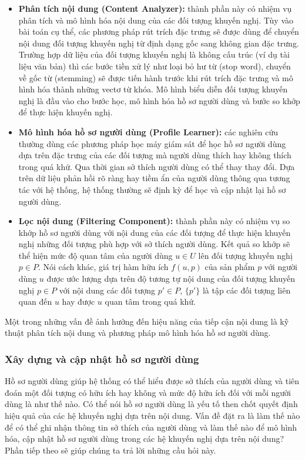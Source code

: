 \begin{itemize}
	\item \textbf{Phân tích nội dung (Content Analyzer):} thành phần này có nhiệm vụ phân tích và mô hình hóa nội dung của các đối tượng khuyến nghị. Tùy vào bài toán cụ thể, các phương pháp rút trích đặc trưng sẽ được dùng để chuyển nội dung đối tượng khuyến nghị từ định dạng gốc sang không gian đặc trưng. Trường hợp dữ liệu của đối tượng khuyến nghị là không cấu trúc (ví dụ tài liệu văn bản) thì các bước tiền xử lý như loại bỏ hư từ (stop word), chuyển về gốc từ (stemming) sẽ được tiến hành trước khi rút trích đặc trưng và mô hình hóa thành những vectơ từ khóa. Mô hình biểu diễn đối tượng khuyến nghị là đầu vào cho bước học, mô hình hóa hồ sơ người dùng và bước so khớp để thực hiện khuyến nghị.
	\item \textbf{Mô hình hóa hồ sơ người dùng (Profile Learner):} các nghiên cứu thường dùng các phương pháp học máy giám sát để học hồ sơ người dùng dựa trên đặc trưng của các đối tượng mà người dùng thích hay không thích trong quá khứ. Qua thời gian sở thích người dùng có thể thay thay đổi. Dựa trên dữ liệu phản hồi rõ ràng hay tiềm ẩn của người dùng thông qua tương tác với hệ thống, hệ thống thường sẽ định kỳ để học và cập nhật lại hồ sơ người dùng.
	\item \textbf{Lọc nội dung (Filtering Component):} thành phần này có nhiệm vụ so khớp hồ sơ người dùng với nội dung của các đối tượng để thực hiện khuyến nghị những đối tượng phù hợp với sở thích người dùng. Kết quả so khớp sẽ thể hiện mức độ quan tâm của người dùng $u\in U$ lên đối tượng khuyến nghị $p\in P$. Nói cách khác, giá trị hàm hữu ích $f(u,p)$ của sản phẩm $p$ với người dùng $u$ được ước lượng dựa trên độ tương tự nội dung của đối tượng khuyến nghị $p \in P$ với nội dung các đối tượng $p' \in P$, $\{p'\}$ là tập các đối tượng liên quan đến $u$ hay được $u$ quan tâm trong quá khứ. 
\end{itemize}

Một trong những vấn đề ảnh hưởng đến hiệu năng của tiếp cận nội dung là kỹ thuật phân tích nội dung và phương pháp mô hình hóa hồ sơ người dùng. 

\subsubsection{Xây dựng và cập nhật hồ sơ người dùng}
Hồ sơ người dùng giúp hệ thống có thể hiểu được sở thích của người dùng và tiên đoán một đối tượng có hữu ích hay không và mức độ hữu ích đối với mỗi người dùng là như thế nào. Có thể nói hồ sơ người dùng là yếu tố then chốt quyết định hiệu quả của các hệ khuyến nghị dựa trên nội dung. Vấn đề đặt ra là làm thế nào để có thể ghi nhận thông tin sở thích của người dùng và làm thế nào để mô hình hóa, cập nhật hồ sơ người dùng trong các hệ khuyến nghị dựa trên nội dung? Phần tiếp theo sẽ giúp chúng ta trả lời những cầu hỏi này.

